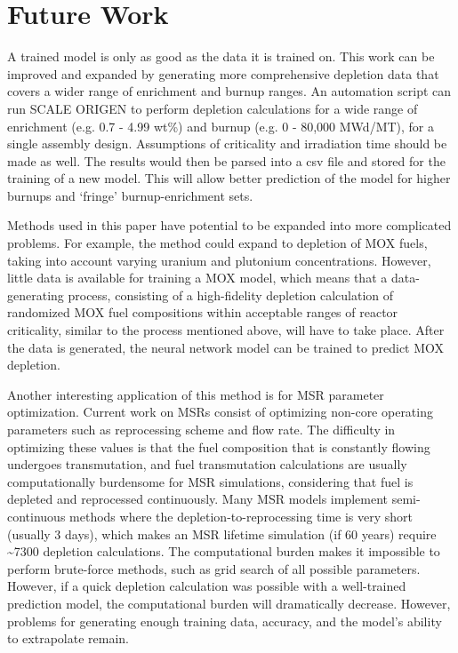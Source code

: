 \section{Future Work}

A trained model is only as good as the data it is trained on.
This work can be improved and expanded by generating
more comprehensive depletion data that covers a wider
range of enrichment and burnup ranges. An automation
script can run SCALE ORIGEN to perform depletion calculations
for a wide range of enrichment (e.g. 0.7 - 4.99 wt\%) and burnup (e.g. 0 - 80,000 MWd/MT),
for a single assembly design. Assumptions of criticality
and irradiation time should be made as well. The results
would then be parsed into a csv file and stored for
the training of a new model. This will allow better
prediction of the model for higher burnups and `fringe'
burnup-enrichment sets.

Methods used in this paper have potential to be expanded into more
complicated problems. For example, the method
could expand to depletion of \gls{MOX} fuels, taking
into account varying uranium and plutonium concentrations.
However, little data is available
for training a \gls{MOX} model, which means that a
data-generating process, consisting of a high-fidelity
depletion calculation of randomized \gls{MOX} fuel
compositions within acceptable ranges of reactor
criticality, similar to the process mentioned above,
will have to take place. After the data
is generated, the neural network model can be trained
to predict \gls{MOX} depletion.

Another interesting application of this method is for
\gls{MSR} parameter optimization. Current work on
\glspl{MSR} consist of optimizing non-core operating
parameters such as reprocessing scheme and flow rate.
The difficulty in optimizing these values is that the
fuel composition that is constantly flowing undergoes
transmutation, and fuel transmutation calculations
are usually computationally burdensome for \gls{MSR}
simulations, considering that fuel is depleted and
reprocessed continuously. Many \gls{MSR} models implement semi-continuous
methods where the depletion-to-reprocessing time is
very short (usually 3 days), which makes an
\gls{MSR} lifetime simulation (if 60 years)
require \textasciitilde 7300 depletion calculations.
The computational burden
makes it impossible to perform brute-force methods,
such as grid search of all possible parameters.
However, if a quick depletion calculation was possible
with a well-trained prediction model, the
computational burden will dramatically decrease.
However, problems for generating enough
training data, accuracy, and the model's ability to
extrapolate remain.